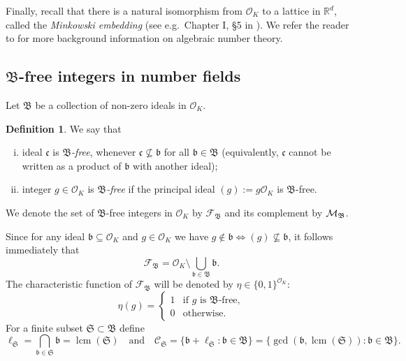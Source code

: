 \documentclass[leqno,a4paper,12pt]{article}
\DeclareMathOperator{\lcm}{lcm}
\theoremstyle{definition}
\newtheorem{Def}[Th]{Definition}
\newcommand{\cM}{{\cal M}}
\newcommand{\R}{{\mathbb{R}}}
\newcommand{\OK}{\mathcal{O}_K}
\newcommand{\cC}{\mathcal{C}}
\begin{document}
Finally, recall that there is a natural isomorphism from $\OK$ to a lattice in $\R^d$, called the \emph{Minkowski embedding} (see e.g.\ Chapter I, \S 5 in \cite{MR1697859}). We refer the reader to  \cite{MR0195803,MR1697859} for more background information on algebraic number theory.

\subsection{$\mathfrak{B}$-free integers in number fields}
Let $\mathfrak{B}$ be a collection of non-zero ideals in $\mathcal{O}_K$.
\begin{Def}
We say that
\begin{enumerate}[(i)]
\item ideal $\mathfrak{c}$ is \emph{$\mathfrak{B}$-free}, whenever $\mathfrak{c}\not\subseteq \mathfrak{b}$ for all $\mathfrak{b}\in\mathfrak{B}$ (equivalently, $\mathfrak{c}$ cannot be written as a product of $\mathfrak{b}$ with another ideal);
\item
integer $g\in\mathcal{O}_K$ is \emph{$\mathfrak{B}$-free} if the principal ideal $(g):=g\mathcal{O}_K$ is $\mathfrak{B}$-free.
\end{enumerate}
We denote the set of $\mathfrak{B}$-free integers in $\mathcal{O}_K$ by $\mathcal{F}_\mathfrak{B}$ and its complement by $\cM_\mathfrak{B}$.
\end{Def}
Since for any ideal $\mathfrak{b}\subseteq \OK$ and $g\in \mathcal{O}_K$ we have $g\not \in \mathfrak{b} \iff (g) \not\subseteq \mathfrak{b}$, it follows immediately that
\begin{equation*}\label{Z:1}
\mathcal{F}_\mathfrak{B}=\mathcal{O}_K\setminus \bigcup_{\mathfrak{b}\in\mathfrak{B}}\mathfrak{b}.
\end{equation*}
The characteristic function of $\mathcal{F}_\mathfrak{B}$ will be denoted by $\eta\in \{0,1\}^{\OK}$:
\begin{equation*}\label{Z:2}
\eta(g)=\begin{cases}
1& \text{if }g \text{ is }\mathfrak{B}\text{-free},\\
0& \text{otherwise}.
\end{cases}
\end{equation*}
For a finite subset $\mathfrak{S}\subset\mathfrak{B}$ define
\begin{equation*}
\ell_\mathfrak{S}=\bigcap_{\mathfrak{b}\in\mathfrak{S}}\mathfrak{b}=\lcm(\mathfrak{S})\quad\text{and}\quad
\cC_\mathfrak{S}=\{\mathfrak{b}+\ell_\mathfrak{S}:\mathfrak{b}\in\mathfrak{B}\}=\{\gcd(\mathfrak{b},\lcm(\mathfrak{S})):\mathfrak{b}\in\mathfrak{B}\}.
\end{equation*}
\end{document}
